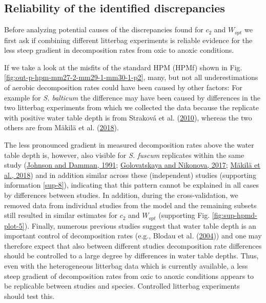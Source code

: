 \documentclass[
  12pt,
]{article}
\begin{document}
\hypertarget{out-discussion-3}{%
\subsection{Reliability of the identified discrepancies}\label{out-discussion-3}}

Before analyzing potential causes of the discrepancies found for \(c_2\) and \(W_{opt}\) we first ask if combining different litterbag experiments is reliable evidence for the less steep gradient in decomposition rates from oxic to anoxic conditions.

If we take a look at the misfits of the standard HPM (HPMf) shown in Fig. \ref{fig:out-p-hpm-mm27-2-mm29-1-mm30-1-p2}, many, but not all underestimations of aerobic decomposition rates could have been caused by other factors: For example for \emph{S. balticum} the difference may have been caused by differences in the two litterbag experiments from which we collected the data because the replicate with positive water table depth is from Straková et al. (\protect\hyperlink{ref-Strakova.2010}{2010}), whereas the two others are from Mäkilä et al. (\protect\hyperlink{ref-Makila.2018}{2018}).

The less pronounced gradient in measured decomposition rates above the water table depth is, however, also visible for \emph{S. fuscum} replicates within the same study (\protect\hyperlink{ref-Johnson.1991}{Johnson and Damman, 1991}; \protect\hyperlink{ref-Golovatskaya.2017}{Golovatskaya and Nikonova, 2017}; \protect\hyperlink{ref-Makila.2018}{Mäkilä et al., 2018}) and in addition similar across these (independent) studies (supporting information \ref{sup-8}), indicating that this pattern cannot be explained in all cases by differences between studies. In addition, during the cross-validation, we removed data from individual studies from the model and the remaining subsets still resulted in similar estimates for \(c_2\) and \(W_{opt}\) (supporting Fig. \ref{fig:sup-hpmd-plot-5}). Finally, numerous previous studies suggest that water table depth is an important control of decomposition rates (e.g., Blodau et al. (\protect\hyperlink{ref-Blodau.2004}{2004})) and one may therefore expect that also between different studies decomposition rate differences should be controlled to a large degree by differences in water table depths. Thus, even with the heterogeneous litterbag data which is currently available, a less steep gradient of decomposition rates from oxic to anoxic conditions appears to be replicable between studies and species. Controlled litterbag experiments should test this.
\end{document}
